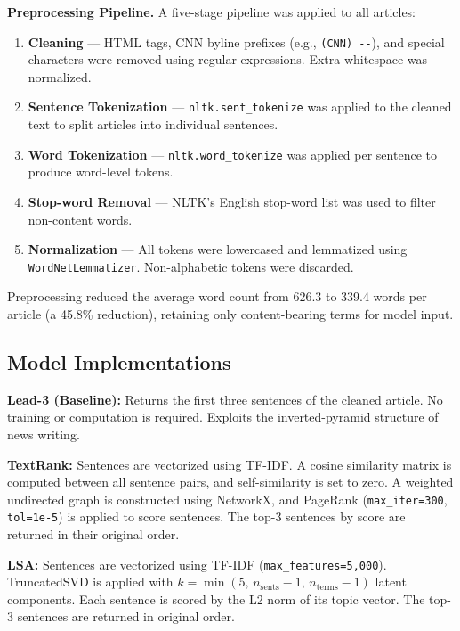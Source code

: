 \documentclass[conference]{IEEEtran}
\begin{document}
\noindent\textbf{Preprocessing Pipeline.}
A five-stage pipeline was applied to all articles:
\begin{enumerate}
    \item \textbf{Cleaning} --- HTML tags, CNN byline prefixes (e.g.,
          \texttt{(CNN) -{}-}), and special characters were removed using
          regular expressions. Extra whitespace was normalized.
    \item \textbf{Sentence Tokenization} --- \texttt{nltk.sent\_tokenize}
          was applied to the cleaned text to split articles into individual
          sentences.
    \item \textbf{Word Tokenization} --- \texttt{nltk.word\_tokenize} was
          applied per sentence to produce word-level tokens.
    \item \textbf{Stop-word Removal} --- NLTK's English stop-word list was
          used to filter non-content words.
    \item \textbf{Normalization} --- All tokens were lowercased and
          lemmatized using \texttt{WordNetLemmatizer}. Non-alphabetic
          tokens were discarded.
\end{enumerate}

Preprocessing reduced the average word count from 626.3 to 339.4 words
per article (a 45.8\% reduction), retaining only content-bearing terms
for model input.

\subsection{Model Implementations}

\noindent\textbf{Lead-3 (Baseline):}
Returns the first three sentences of the cleaned article. No training or
computation is required. Exploits the inverted-pyramid structure of news
writing.

\noindent\textbf{TextRank:}
Sentences are vectorized using TF-IDF. A cosine similarity matrix is
computed between all sentence pairs, and self-similarity is set to zero.
A weighted undirected graph is constructed using NetworkX, and PageRank
(\texttt{max\_iter=300}, \texttt{tol=1e-5}) is applied to score
sentences. The top-3 sentences by score are returned in their original
order.

\noindent\textbf{LSA:}
Sentences are vectorized using TF-IDF (\texttt{max\_features=5,000}).
TruncatedSVD is applied with $k = \min(5,\, n_{\text{sents}}-1,\,
n_{\text{terms}}-1)$ latent components. Each sentence is scored by the
L2 norm of its topic vector. The top-3 sentences are returned in original
order.
\end{document}
